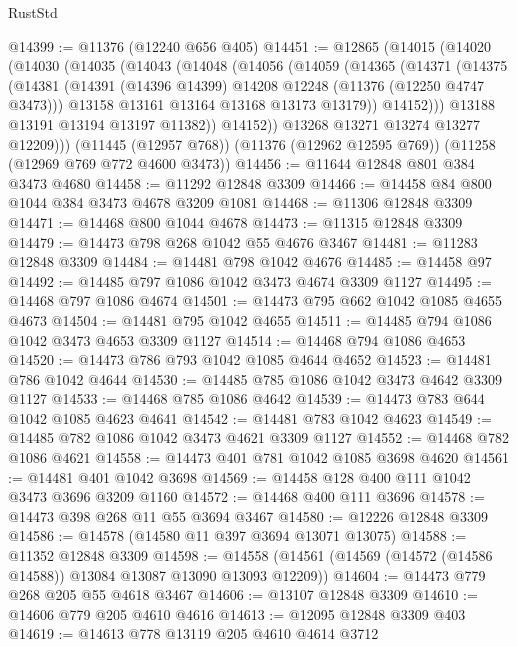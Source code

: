 \begin{lexlean}{RustStd}
\begin{coremodule}
{{{{{{{{{{{{{{{{{{{@14399 := @11376 (@12240 @656 @405)
@14451 := @12865
    (@14015
      (@14020
        (@14030
          (@14035
            (@14043
              (@14048
                (@14056
                  (@14059
                    (@14365
                      (@14371
                        (@14375
                          (@14381
                            (@14391 (@14396 @14399) @14208 @12248 (@11376 (@12250 @4747 @3473)))
                            @13158
                            @13161
                            @13164
                            @13168
                            @13173
                            @13179))
                        @14152)))
                  @13188
                  @13191
                  @13194
                  @13197
                  @11382))
              @14152))
          @13268
          @13271
          @13274
          @13277
          @12209)))
    (@11445 (@12957 @768))
    (@11376 (@12962 @12595 @769))
    (@11258 (@12969 @769 @772 @4600 @3473))
@14456 := @11644 @12848 @801 @384 @3473 @4680
@14458 := @11292 @12848 @3309
@14466 := @14458 @84 @800 @1044 @384 @3473 @4678 @3209 @1081
@14468 := @11306 @12848 @3309
@14471 := @14468 @800 @1044 @4678
@14473 := @11315 @12848 @3309
@14479 := @14473 @798 @268 @1042 @55 @4676 @3467
@14481 := @11283 @12848 @3309
@14484 := @14481 @798 @1042 @4676
@14485 := @14458 @97
@14492 := @14485 @797 @1086 @1042 @3473 @4674 @3309 @1127
@14495 := @14468 @797 @1086 @4674
@14501 := @14473 @795 @662 @1042 @1085 @4655 @4673
@14504 := @14481 @795 @1042 @4655
@14511 := @14485 @794 @1086 @1042 @3473 @4653 @3309 @1127
@14514 := @14468 @794 @1086 @4653
@14520 := @14473 @786 @793 @1042 @1085 @4644 @4652
@14523 := @14481 @786 @1042 @4644
@14530 := @14485 @785 @1086 @1042 @3473 @4642 @3309 @1127
@14533 := @14468 @785 @1086 @4642
@14539 := @14473 @783 @644 @1042 @1085 @4623 @4641
@14542 := @14481 @783 @1042 @4623
@14549 := @14485 @782 @1086 @1042 @3473 @4621 @3309 @1127
@14552 := @14468 @782 @1086 @4621
@14558 := @14473 @401 @781 @1042 @1085 @3698 @4620
@14561 := @14481 @401 @1042 @3698
@14569 := @14458 @128 @400 @111 @1042 @3473 @3696 @3209 @1160
@14572 := @14468 @400 @111 @3696
@14578 := @14473 @398 @268 @11 @55 @3694 @3467
@14580 := @12226 @12848 @3309
@14586 := @14578 (@14580 @11 @397 @3694 @13071 @13075)
@14588 := @11352 @12848 @3309
@14598 := @14558 (@14561 (@14569 (@14572 (@14586 @14588)) @13084 @13087 @13090 @13093 @12209))
@14604 := @14473 @779 @268 @205 @55 @4618 @3467
@14606 := @13107 @12848 @3309
@14610 := @14606 @779 @205 @4610 @4616
@14613 := @12095 @12848 @3309 @403
@14619 := @14613 @778 @13119 @205 @4610 @4614 @3712
}}}}}}}}}}}}}}}}}}}
\end{coremodule}
\end{lexlean}

